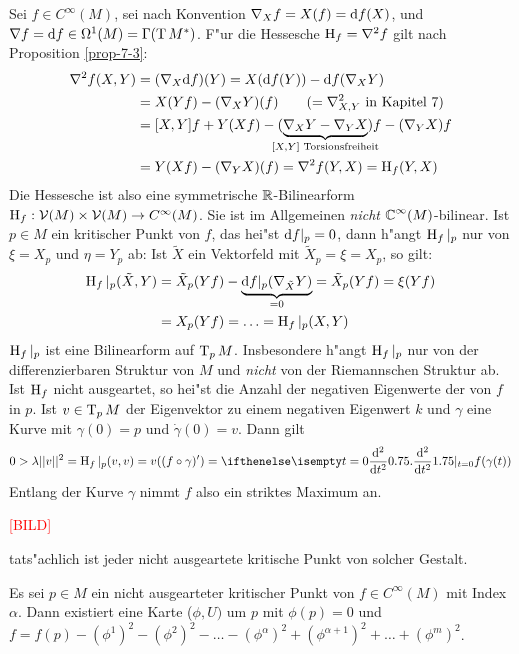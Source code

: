 Sei $f \in C^\infty(M)$, sei nach Konvention $\nabla_X f = X(f) = \mathrm{d} f(X)$, und $\nabla f = \mathrm{d} f \in \Omega^1(M) = \Gamma(\operatorname{T} M^*)$. F"ur die Hessesche $\operatorname{H}_f = \nabla^2 f$ gilt nach Proposition \ref{prop-7-3}:
\begin{align*}
	\nabla^2 f (X,Y) &= (\nabla_X \dop f)(Y) = X(\dop f(Y)) - \dop f(\nabla_X Y)\\
	&= X(Yf) - (\nabla_X Y)(f) \qquad (= \nabla_{X,Y}^2 \text{ in Kapitel 7})\\
	&= [X,Y]f + Y(Xf) - (\underbrace{\nabla_X Y - \nabla_Y X}_{\mathclap{[X,Y] \text{ Torsionsfreiheit}}}) f - (\nabla_Y X) f\\
	&= Y(Xf) - (\nabla_YX)(f) = \nabla^2 f(Y,X) = \Hh_f(Y,X)
\end{align*}
Die Hessesche ist also eine symmetrische $\operatorname{\mathbb{R}}$-Bilinearform $\operatorname{H}_f: \operatorname{\mathcal{V}}(M) \times \operatorname{\mathcal{V}}(M) \to C^\infty(M)$. Sie ist im Allgemeinen \emph{nicht} $\operatorname{\mathbb{C}}^\infty(M)$-bilinear. Ist $p \in M$ ein kritischer Punkt von $f$, das hei"st $\mathrm{d} f|_p = 0$, dann h"angt $\operatorname{H}_f|_p$ nur von $\xi = X_p$ und $\eta = Y_p$ ab: Ist $\tilde X$ ein Vektorfeld mit $\tilde X_p = \xi = X_p$, so gilt:
\begin{align*}
	\operatorname{H}_f|_p(\tilde X,Y) &= \tilde X_p(Yf) - \underbrace{\mathrm{d} f|_p(\nabla_{\tilde X}Y)}_{=0} = \tilde X_p(Yf) = \xi(Yf)\\
	&= X_p(Yf) = \ldots = \operatorname{H}_f|_p(X,Y)
\end{align*}
$\operatorname{H}_f|_p$ ist eine Bilinearform auf $\operatorname{T}_pM$. Insbesondere h"angt $\operatorname{H}_f|_p$ nur von der differenzierbaren Struktur von $M$ und \emph{nicht} von der Riemannschen Struktur ab.
Ist $\operatorname{H}_f$ nicht ausgeartet, so hei"st die Anzahl der negativen Eigenwerte der  von $f$ in $p$.
Ist $v \in \operatorname{T}_pM$ der Eigenvektor zu einem negativen Eigenwert $k$ und $\gamma$ eine Kurve mit $\gamma(0)=p$ und $\dot\gamma(0)=v$. Dann gilt
\begin{align*}
	0 > \lambda || v ||^2 = \Hh_f|_p (v,v) = v((f \circ \gamma)') = \difffrac[t=0]{^2}{t^2} f(\gamma(t))
\end{align*}
Entlang der Kurve $\gamma$ nimmt $f$ also ein striktes Maximum an.
\begin{center}\textcolor{red}{[BILD]}\end{center}
tats"achlich ist jeder nicht ausgeartete kritische Punkt von solcher Gestalt.

\begin{emptythm}
Es sei $p \in M$ ein nicht ausgearteter kritischer Punkt von $f \in C^\infty(M)$ mit Index $\alpha$. Dann existiert eine Karte ($\phi, U)$ um $p$ mit $\phi(p) = 0$ und $f = f(p) - (\phi^1)^2 - (\phi^2)^2 - \ldots  -(\phi^\alpha)^2 + (\phi^{\alpha+1})^2 + \ldots + (\phi^m)^2$.
\end{emptythm}

